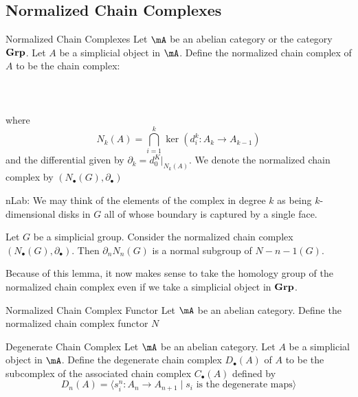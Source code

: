 \documentclass[a4paper]{article}
\begin{document}
\subsection{Normalized Chain Complexes}
\begin{defn}{Normalized Chain Complexes}{} Let $\mA$ be an abelian category or the category $\bold{Grp}$. Let $A$ be a simplicial object in $\mA$. Define the normalized chain complex of $A$ to be the chain complex: \\~\\
\\~\\
where $$N_k(A)=\bigcap_{i=1}^k\ker(d_i^k:A_k\to A_{k-1})$$ and the differential given by $\partial_k=d_0^K|_{N_k(A)}$. We denote the normalized chain complex by $(N_\bullet(G),\partial_\bullet)$
\end{defn}

nLab: We may think of the elements of the complex in degree $k$ as being $k$-dimensional disks in $G$ all of whose boundary is captured by a single face. 

\begin{lmm}{}{} Let $G$ be a simplicial group. Consider the normalized chain complex $(N_\bullet(G),\partial_\bullet)$. Then $\partial_n N_n(G)$ is a normal subgroup of $N-{n-1}(G)$. 
\end{lmm}

Because of this lemma, it now makes sense to take the homology group of the normalized chain complex even if we take a simplicial object in $\bold{Grp}$. 

\begin{defn}{Normalized Chain Complex Functor}{} Let $\mA$ be an abelian category. Define the normalized chain complex functor $N$
\end{defn}

\begin{defn}{Degenerate Chain Complex}{} Let $\mA$ be an abelian category. Let $A$ be a simplicial object in $\mA$. Define the degenerate chain complex $D_\bullet(A)$ of $A$ to be the subcomplex of the associated chain complex $C_\bullet(A)$ defined by $$D_n(A)=\langle s_i^n:A_n\to A_{n+1}\;|\;s_i\text{ is the degenerate maps}\rangle$$
\end{defn}
\end{document}
